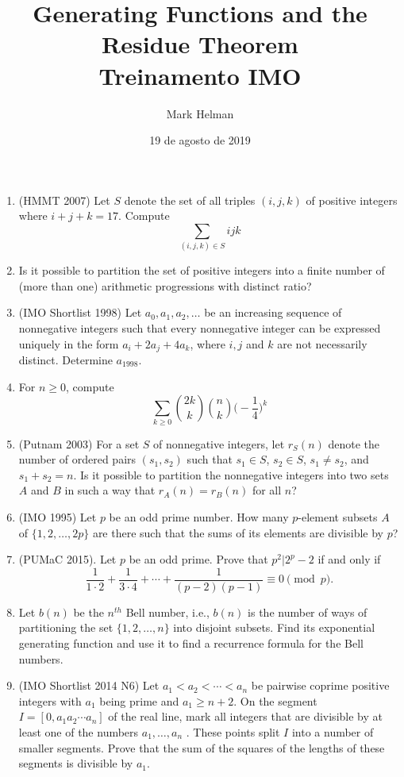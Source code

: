 \documentclass[11pt]{article}
\begin{document}
\author{Mark Helman}
\title{Generating Functions and the Residue Theorem \\Treinamento IMO}
\date{19 de agosto de 2019}
\maketitle

\medskip

\begin{enumerate}

\item
(HMMT 2007) Let $S$ denote the set of all triples $(i, j, k)$ of positive integers where $i + j + k = 17$. Compute
\[\sum_{(i,j,k)\in S} ijk\]

\item
Is it possible to partition the set of positive integers into a finite number of (more than one) arithmetic progressions with distinct ratio?

\item
(IMO Shortlist 1998) Let $a_{0},a_{1},a_{2},\ldots $ be an increasing sequence of nonnegative integers such that every nonnegative integer can be expressed uniquely in the form $a_{i}+2a_{j}+4a_{k}$, where $i,j$ and $k$ are not necessarily distinct. Determine $a_{1998}$.
\item
For $n \geq 0$, compute
\[\sum_{k\geq 0} \binom{2k}{k} \binom{n}{k} \bigg ( -\frac{1}{4} \bigg )^k\]

\item
(Putnam 2003) For a set $S$ of nonnegative integers, let $r_S(n)$ denote the number of ordered pairs $(s_1, s_2)$ such that $s_1 \in S$, $s_2 \in S$, $s_1 \neq s_2$, and $s_1 + s_2 = n$. Is it possible to partition the nonnegative integers into two sets $A$ and $B$ in such a way that $r_A(n) = r_B(n)$ for all $n$?

\item
(IMO 1995) Let $p$ be an odd prime number. How many $p$-element subsets $A$ of $\{1, 2,\ldots, 2p\}$
are there such that the sums of its elements are divisible by $p$?

\item
(PUMaC 2015). Let $p$ be an odd prime. Prove that $p^2|2^p-2$ if and only if
\[\frac{1}{1\cdot2}+\frac{1}{3\cdot4}+\cdots+\frac{1}{(p-2)(p-1)}\equiv0\pmod{p}.\]

\item
Let $b(n)$ be the $n^{th}$ Bell number, i.e., $b(n)$ is the number of ways of partitioning the set $\{1,2,\ldots,n\}$ into disjoint subsets. Find its exponential generating function and use it to find a recurrence formula for the Bell numbers.
\item
 (IMO Shortlist 2014 N6) Let $a_1 < a_2 <  \cdots <a_n$ be pairwise coprime positive integers with $a_1$ being prime and $a_1 \ge n + 2$. On the segment $I = [0, a_1 a_2  \cdots a_n ]$ of the real line, mark all integers that are divisible by at least one of the numbers $a_1 ,   \ldots , a_n$ . These points split $I$ into a number of smaller segments. Prove that the sum of the squares of the lengths of these segments is divisible by $a_1$.


\end{enumerate}
\end{document}
